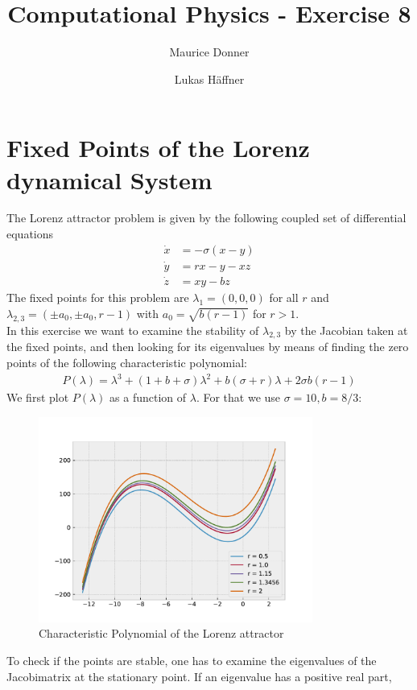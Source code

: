 \documentclass{article}
\title{Computational Physics - Exercise 8}
\author{Maurice Donner \and Lukas Häffner}
\begin{document}
\maketitle
\newpage

\section{Fixed Points of the Lorenz dynamical System}

The Lorenz attractor problem is given by the following coupled set of 
differential equations
\begin{align}
    \dot x &= - \sigma (x - y ) \\
    \dot y &= rx - y - xz \\
    \dot z &= xy - bz
    \label{Lorenz}
\end{align}
The fixed points for this problem are \( \lambda_1 = (0,0,0) \) for all \( r \)
and \( \lambda_{2,3} = (\pm a_0, \pm a_0, r-1 )\) with \( a_0 = 
    \sqrt{b(r-1)}\) for \( r > 1 \).\\
In this exercise we want to examine the stability of \( \lambda_{2,3} \) by the
Jacobian taken at the fixed points, and then looking for its eigenvalues by means
of finding the zero points of the following characteristic polynomial:
\begin{align}
    P(\lambda) = \lambda^3 + (1+b+\sigma)\lambda^2 +b(\sigma+r)\lambda
    + 2 \sigma b (r-1)
\end{align}
We first plot $P(\lambda)$ as a function of \( \lambda \). For that we use
\( \sigma = 10, b = 8/3 \):
\begin{figure}[H]
    \centering
    \includegraphics[width=9cm]{polynomial.pdf} 
    \caption{Characteristic Polynomial of the Lorenz attractor} 
\end{figure}
To check if the points are stable, one has to examine the eigenvalues of the
Jacobimatrix at the stationary point. If an eigenvalue has a positive real part,
\end{document}
